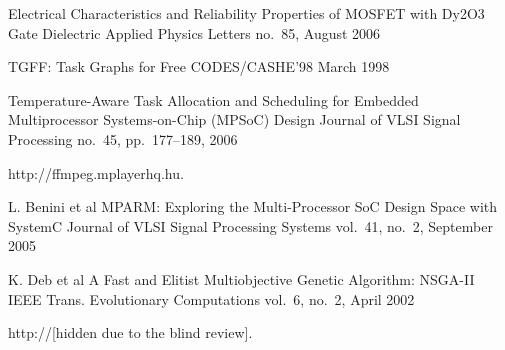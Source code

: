 \begin{thebibliography}{99}
    \publication
      {}
      {Electrical Characteristics and Reliability Properties of MOSFET with Dy2O3 Gate Dielectric}
      {Applied Physics Letters}
      {no.~85, August 2006}


    \publication
      {}
      {TGFF: Task Graphs for Free}
      {CODES/CASHE'98}
      {March 1998}

    \publication
      {}
      {Temperature-Aware Task Allocation and Scheduling for Embedded Multiprocessor Systems-on-Chip (MPSoC) Design}
      {Journal of VLSI Signal Processing}
      {no.~45, pp.~177--189, 2006}

    http://ffmpeg.mplayerhq.hu.

    \publication
      {L. Benini et al}
      {MPARM: Exploring the Multi-Processor SoC Design Space with SystemC}
      {Journal of VLSI Signal Processing Systems}
      {vol.~41, no.~2, September 2005}

    \publication
      {K. Deb et al}
      {A Fast and Elitist Multiobjective Genetic Algorithm: NSGA-II}
      {IEEE Trans. Evolutionary Computations}
      {vol.~6, no.~2, April 2002}

    http://[hidden due to the blind review].

\end{thebibliography}
